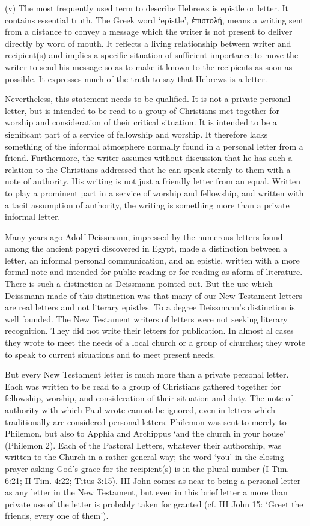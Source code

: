 (v) The most frequently used term to describe Hebrews is epistle or letter.
It contains essential truth.
The Greek word `epistle', ἐπιστολή, means a writing sent from a distance to
convey a message which the writer is not present to deliver directly by word of
mouth.
It reflects a living relationship between writer and recipient(s) and implies a
specific situation of sufficient importance to move the writer to send his
message so as to make it known to the recipients as soon as possible.
It expresses much of the truth to say that Hebrews is a letter.

Nevertheless, this statement needs to be qualified.
It is not a private personal letter, but is intended to be read to a group of
Christians met together for worship and consideration of their critical
situation.
It is intended to be a significant part of a service of fellowship and worship.
It therefore lacks something of the informal atmosphere normally found in a
personal letter from a friend.
Furthermore, the writer assumes without discussion that he has such a relation
to the Christians addressed that he can speak sternly to them with a note of
authority.
His writing is not just a friendly letter from an equal.
Written to play a prominent part in a service of worship and fellowship, and
written with a tacit assumption of authority, the writing is something more than
a private informal letter.

Many years ago Adolf Deissmann, impressed by the numerous letters found among
the ancient papyri discovered in Egypt, made a distinction between a letter, an
informal personal communication, and an epistle, written with a more formal note
and intended for public reading or for reading as aform of literature.
There is such a distinction as Deissmann pointed out.
But the use which Deissmann made of this distinction was that many of our New
Testament letters are real letters and not literary epistles.
To a degree Deissmann's distinction is well founded.
The New Testament writers of letters were not seeking literary recognition.
They did not write their letters for publication.
In almost al cases they wrote to meet the needs of a local church or a group of
churches; they wrote to speak to current situations and to meet present needs.

But every New Testament letter is much more than a private personal letter.
Each was written to be read to a group of Christians gathered together for
fellowship, worship, and consideration of their situation and duty.
The note of authority with which Paul wrote cannot be ignored, even in letters
which traditionally are considered personal letters.
Philemon was sent to merely to Philemon, but also to Apphia and Archippus `and
the church in your house' (Philemon 2).
Each of the Pastoral Letters, whatever their authorship, was written to the
Church in a rather general way; the word `you' in the closing prayer asking
God's grace for the recipient(s) is in the plural number (I Tim. 6:21; II Tim.
4:22; Titus 3:15).
III John comes as near to being a personal letter as any letter in the New
Testament, but even in this brief letter a more than private use of the letter
is probably taken for granted (cf. III John 15: `Greet the friends, every one of
them').

